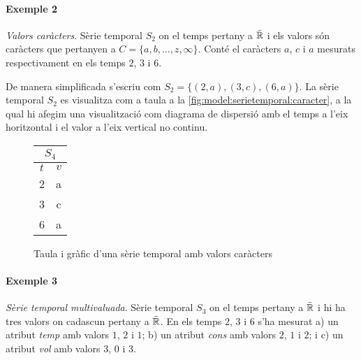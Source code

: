 \paragraph{Exemple 2} \emph{Valors caràcters}.  Sèrie temporal $S_2$
on el temps pertany a $\bar{\mathbb{R}{}}$ i els valors són caràcters
que pertanyen a $C=\{a,b,\dotsc,z,\infty\}$. Conté el caràcters $a$,
$c$ i $a$ mesurats respectivament en els temps $2$, $3$ i
$6$. 

De manera simplificada s'escriu com $S_2 = \{ (2,a), (3,c), (6,a) \}$.
La sèrie temporal $S_2$ es visualitza com a taula a la
\autoref{fig:model:serietemporal:caracter}, a la qual hi afegim una
visualització com diagrama de dispersió amb el temps a l'eix
horitzontal i el valor a l'eix vertical no continu.

\begin{figure}[tp]
  \centering
  \begin{tabular}[c]{|c|c|}
    \multicolumn{2}{c}{$S_4$} \\ \hline
    $t$  & $v$ \\ \hline
    2  & a \\
    3  & c \\
    6  & a \\ \hline
  \end{tabular} \qquad
  \caption{Taula i gràfic d'una sèrie temporal amb valors caràcters}
  \label{fig:model:serietemporal:caracter}
\end{figure}




\paragraph{Exemple 3} \emph{Sèrie temporal multivaluada}.  Sèrie
temporal $S_3$ on el temps pertany a $\bar{\mathbb{R}{}}$ i hi ha tres
valors on cadascun pertany a $\bar{\mathbb{R}{}}$. En els temps $2$, $3$
i $6$ s'ha mesurat a) un atribut \emph{temp} amb valors $1$, $2$ i
$1$; b) un atribut \emph{cons} amb valors $2$, $1$ i $2$; i c) un
atribut \emph{vol} amb valors $3$, $0$ i $3$.



